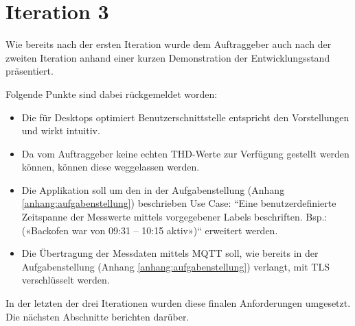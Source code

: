 \section{Iteration 3}
\label{i3}
Wie bereits nach der ersten Iteration wurde dem Auftraggeber auch nach der zweiten Iteration
anhand einer kurzen Demonstration der Entwicklungsstand präsentiert.

Folgende Punkte sind dabei rückgemeldet worden:
\begin{itemize}
    \item Die für Desktops optimiert Benutzerschnittstelle entspricht den Vorstellungen und wirkt intuitiv.
    \item Da vom Auftraggeber keine echten \ac{THD}-Werte zur Verfügung gestellt werden können,
          können diese weggelassen werden.
    \item Die Applikation soll um den in der Aufgabenstellung (Anhang \ref{anhang:aufgabenstellung}) beschrieben Use Case:
          ``Eine benutzerdefinierte Zeitspanne der Messwerte mittels vorgegebener
          Labels beschriften. Bsp.: («Backofen war von 09:31 – 10:15 aktiv»)`` erweitert werden.
    \item Die Übertragung der Messdaten mittels \ac{MQTT} soll,
          wie bereits in der Aufgabenstellung (Anhang \ref{anhang:aufgabenstellung}) verlangt, mit \ac{TLS} verschlüsselt werden.
\end{itemize}
In der letzten der drei Iterationen wurden diese finalen Anforderungen umgesetzt.
Die nächsten Abschnitte berichten darüber.

